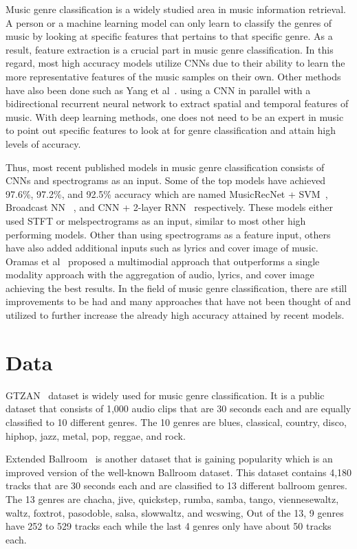 \documentclass[10pt,twocolumn,letterpaper]{article}
\begin{document}
	Music genre classification is a widely studied area in music information retrieval. A person or a machine learning model can only learn to classify the genres of music by looking at specific features that pertains to that specific genre. As a result, feature extraction is a crucial part in music genre classification. In this regard, most high accuracy models utilize CNNs due to their ability to learn the more representative features of the music samples on their own. Other methods have also been done such as Yang et al~\cite{yang2020parallel}. using a CNN in parallel with a bidirectional recurrent neural network to extract spatial and temporal features of music. With deep learning methods, one does not need to be an expert in music to point out specific features to look at for genre classification and attain high levels of accuracy.  
	
	Thus, most recent published models in music genre classification consists of CNNs and spectrograms as an input. Some of the top models have achieved 97.6\%, 97.2\%, and 92.5\% accuracy which are named MusicRecNet + SVM~\cite{elbir2020music}, Broadcast NN~\cite{liu2020bottom} , and CNN + 2-layer RNN~\cite{yang2020parallel} respectively. These models either used STFT or melspectrograms as an input, similar to most other high performing models. Other than using spectrograms as a feature input, others have also added additional inputs such as lyrics and cover image of music. Oramas et al~\cite{oramas2017multi} proposed a multimodial approach that outperforms a single modality approach with the aggregation of audio, lyrics, and cover image achieving the best results. In the field of music genre classification, there are still improvements to be had and many approaches that have not been thought of and utilized to further increase the already high accuracy attained by recent models.
	
	\section{Data} %
	
	GTZAN~\cite{tzanetakis2002musical} dataset is widely used for music genre classification. It is a public dataset that consists of 1,000 audio clips that are 30 seconds each and are equally classified to 10 different genres. The 10 genres are blues, classical, country, disco, hiphop, jazz, metal, pop, reggae, and rock.
	
	Extended Ballroom~\cite{marchand2016extended} is another dataset that is gaining popularity which is an improved version of the well-known Ballroom dataset. This dataset contains 4,180 tracks that are 30 seconds each and are classified to 13 different ballroom genres. The 13 genres are chacha, jive, quickstep, rumba, samba, tango, viennesewaltz, waltz, foxtrot, pasodoble, salsa, slowwaltz, and wcswing, Out of the 13, 9 genres have 252 to 529 tracks each while the last 4 genres only have about 50 tracks each.
	
\end{document}
